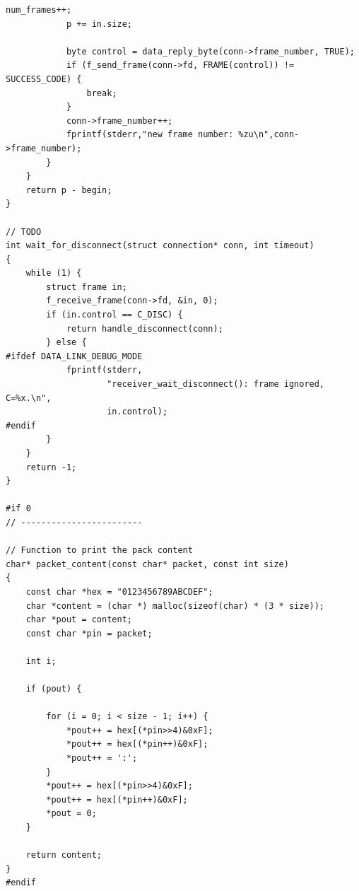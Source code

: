 \documentclass[a4paper,11pt,titlepage]{article}
\begin{document}
\begin{lstlisting}[style=customcwithlines]
			num_frames++;
			p += in.size;

			byte control = data_reply_byte(conn->frame_number, TRUE);
			if (f_send_frame(conn->fd, FRAME(control)) != SUCCESS_CODE) {
				break;
			}
			conn->frame_number++;
            fprintf(stderr,"new frame number: %zu\n",conn->frame_number);
		}
	}
	return p - begin;
}

// TODO
int wait_for_disconnect(struct connection* conn, int timeout)
{
	while (1) {
		struct frame in;
		f_receive_frame(conn->fd, &in, 0);
		if (in.control == C_DISC) {
			return handle_disconnect(conn);
		} else {
#ifdef DATA_LINK_DEBUG_MODE
			fprintf(stderr,
					"receiver_wait_disconnect(): frame ignored, C=%x.\n",
					in.control);
#endif
		}
	}
	return -1;
}

#if 0
// ------------------------

// Function to print the pack content
char* packet_content(const char* packet, const int size)
{
	const char *hex = "0123456789ABCDEF";
	char *content = (char *) malloc(sizeof(char) * (3 * size));
	char *pout = content;
	const char *pin = packet;

	int i;

	if (pout) {

		for (i = 0; i < size - 1; i++) {
			*pout++ = hex[(*pin>>4)&0xF];
			*pout++ = hex[(*pin++)&0xF];
			*pout++ = ':';
		}
		*pout++ = hex[(*pin>>4)&0xF];
		*pout++ = hex[(*pin++)&0xF];
		*pout = 0;
	}

	return content;
}
#endif
\end{lstlisting}
\end{document}

